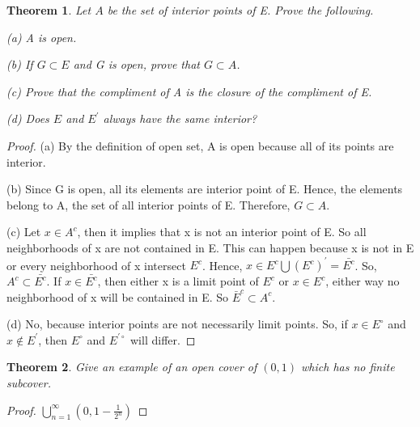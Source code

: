 \documentclass{article}
\theoremstyle{plain}
\newtheorem{theorem}{Theorem}
\theoremstyle{definition}
\begin{document}
\begin{theorem}
	Let $A$ be the set of interior points of E. Prove the following.
	
	(a) A is open.
	
	(b) If $G \subset E$ and G is open, prove that $G \subset A$.
	
	(c) Prove that the compliment of A is the closure of the compliment of E.
	
	(d) Does $E$ and $E^{'}$ always have the same interior?
	
\end{theorem}
\begin{proof}

	(a) By the definition of open set, A is open because all of its points are interior.
	
	(b) Since G is open, all its elements are interior point of E. Hence, the elements belong to A, the set of all interior points of E. Therefore, $G \subset A$.
	
	(c) Let $x \in A^{c}$, then it implies that x is not an interior point of E. So all neighborhoods of x are not contained in E. This can happen because x is not in E or every neighborhood of x intersect $E^{c}$. Hence, $x \in E^{c} \bigcup (E^{c})^{'} = \bar{E^{c}}$. So, $A^{c} \subset \bar{E^{c}}$. If $x \in \bar{E^{c}}$, then either x is a limit point of $E^{c}$ or $x \in E^{c}$, either way no neighborhood of x will be contained in E. So $\bar{E}^{c} \subset A^{c}$.
	
	(d) No, because interior points are not necessarily limit points. So, if $x \in E^{\circ}$ and $x \not \in E^{'}$, then $E^{\circ}$ and $E^{'\circ}$ will differ.
\end{proof}
\begin{theorem}
	Give an example of an open cover of $(0,1)$ which has no finite subcover.
\end{theorem}
\begin{proof}
	$\bigcup_{n = 1}^{\infty} (0,1 - \frac{1}{2^{n}})$
\end{proof}
\end{document}
